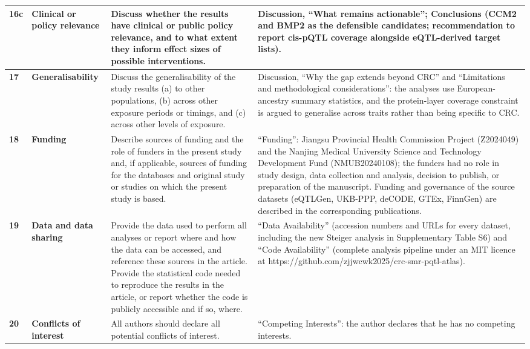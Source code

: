 \documentclass[10pt,a4paper]{article}
\begin{document}
\begin{longtable}{@{}p{7mm}p{32mm}p{52mm}p{68mm}@{}}
\midrule
\textbf{16c} & \textbf{Clinical or policy relevance} & Discuss whether the results have clinical or public policy relevance, and to what extent they inform effect sizes of possible interventions. & Discussion, ``What remains actionable''; Conclusions (CCM2 and BMP2 as the defensible candidates; recommendation to report cis-pQTL coverage alongside eQTL-derived target lists). \\
\midrule
\textbf{17} & \textbf{Generalisability} & Discuss the generalisability of the study results (a) to other populations, (b) across other exposure periods or timings, and (c) across other levels of exposure. & Discussion, ``Why the gap extends beyond CRC'' and ``Limitations and methodological considerations'': the analyses use European-ancestry summary statistics, and the protein-layer coverage constraint is argued to generalise across traits rather than being specific to CRC. \\
\midrule
\textbf{18} & \textbf{Funding} & Describe sources of funding and the role of funders in the present study and, if applicable, sources of funding for the databases and original study or studies on which the present study is based. & ``Funding'': Jiangsu Provincial Health Commission Project (Z2024049) and the Nanjing Medical University Science and Technology Development Fund (NMUB20240108); the funders had no role in study design, data collection and analysis, decision to publish, or preparation of the manuscript. Funding and governance of the source datasets (eQTLGen, UKB-PPP, deCODE, GTEx, FinnGen) are described in the corresponding publications. \\
\midrule
\textbf{19} & \textbf{Data and data sharing} & Provide the data used to perform all analyses or report where and how the data can be accessed, and reference these sources in the article. Provide the statistical code needed to reproduce the results in the article, or report whether the code is publicly accessible and if so, where. & ``Data Availability'' (accession numbers and URLs for every dataset, including the new Steiger analysis in Supplementary Table S6) and ``Code Availability'' (complete analysis pipeline under an MIT licence at https://github.com/zjjwcwk2025/crc-smr-pqtl-atlas). \\
\midrule
\textbf{20} & \textbf{Conflicts of interest} & All authors should declare all potential conflicts of interest. & ``Competing Interests'': the author declares that he has no competing interests. \\
\midrule
\end{longtable}
\end{document}
